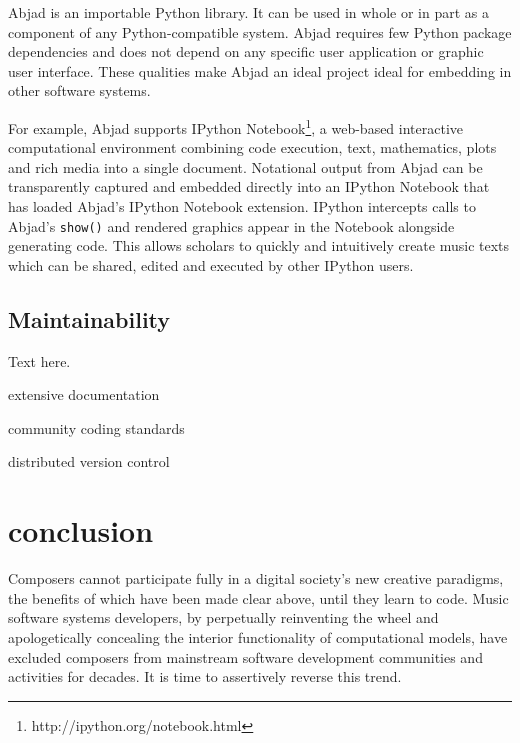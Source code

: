 \documentclass{article}
\begin{document}
Abjad is an importable Python library. It can be used in whole or in part as a
component of any Python-compatible system. Abjad requires few Python package
dependencies and does not depend on any specific user application or graphic
user interface. These qualities make Abjad an ideal project ideal for embedding
in other software systems.

For example, Abjad supports IPython
Notebook\footnote{http://ipython.org/notebook.html}, a web-based interactive
computational environment combining code execution, text, mathematics, plots
and rich media into a single document. Notational output from Abjad can be
transparently captured and embedded directly into an IPython Notebook that has
loaded Abjad's IPython Notebook extension. IPython intercepts calls to Abjad's
\texttt{show()} and rendered graphics appear in the Notebook alongside
generating code. This allows scholars to quickly and intuitively create music
texts which can be shared, edited and executed by other IPython users.

\subsection{Maintainability}

Text here.

extensive documentation

community coding standards

distributed version control

\section{conclusion} \label{sec:conclusion}

Composers cannot participate fully in a digital society's new creative
paradigms, the benefits of which have been made clear above, until they learn
to code. Music software systems developers, by perpetually reinventing the
wheel and apologetically concealing the interior functionality of computational
models, have excluded composers from mainstream software development
communities and activities for decades. It is time to assertively reverse this
trend.


\end{document}

